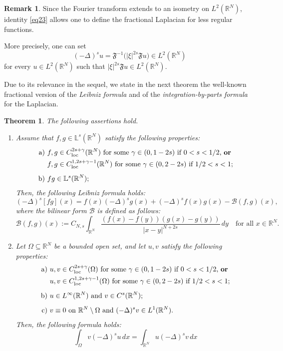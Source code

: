 \documentclass[11pt,a4paper,reqno]{amsart}
\def \R {\mathbb{R}}
\theoremstyle{definition}
\newtheorem{remark}[definition]{Remark}
\theoremstyle{plain}
\newtheorem{theorem}[definition]{Theorem}
\numberwithin{equation}{section}
\begin{document}
\begin{remark} \label{rem:hintweakLap}
Since the Fourier transform extends to an isometry on $L^2(\R^N)$, identity \eqref{eq23} allows one to define the fractional Laplacian for less regular functions.

More precisely, one can set
$$(-\Delta)^s u = \mathfrak F^{-1} \big( |\xi|^{2s}\mathfrak F u  \big)\in L^2(\R^N)$$
for every $u\in L^2(\R^N)$ such that $|\xi|^{2s}\mathfrak F u \in L^2(\R^N)$.
\end{remark}
Due to its relevance in the sequel,
we  state
in the next theorem the well-known frac\-tional version of the \emph{Leibniz formula} and of the \emph{integration-by-parts formula}
for the Laplacian.
\begin{theorem}  \label{thm:LeibnizandByParts}
The following assertions hold.
\begin{enumerate}
	\item Assume that $f,g\in\mathbb{L}^s(\R^N)$ satisfy
  the following properties:
\begin{align*}
	\mathrm{a)}\,\,&\text{$f,g\in C_{\mathrm{loc}}^{2s+\gamma}(\R^N)$ for some $\gamma\in (0,1-2s)$ if $0<s<1/2$, \textbf{or}} \\
	&\text{$f,g\in C^{1,2s+\gamma-1}_{\mathrm{loc}}(\R^N)$
	for some
  	$\gamma\in (0,2-2s)$ if $1/2<s<1$}; \\[0.15cm]
  	\mathrm{b)}\,\,&fg\in\mathbb{L}^s(\R^N);
\end{align*}
 Then, the following \emph{Leibniz formula} holds:
 \begin{equation}\label{eq:Leibniz_rule}
	(-\Delta)^s[fg](x) = f(x) (-\Delta)^s g(x) + (-\Delta)^sf(x) g(x) - \mathcal{B}(f,g)(x),
\end{equation}
\noindent where the bilinear form $\mathcal{B}$ is defined as follows:
\begin{equation}\label{eq:def_B}
	\mathcal{B}(f,g)(x):=C_{N,s}\int_{\mathbb{R}^{N}}\dfrac{(f(x)-f(y))(g(x)-g(y))}{|x-y|^{N+2s}}\, dy \quad \textrm{for all } x \in \mathbb{R}^{N}.
\end{equation}

\item Let $\Omega\subseteq\R^N$ be a bounded open set,
and let $u,v$ satisfy the following properties:
	\begin{align*}
	\mathrm{a)}\,\,&\text{$u,v\in C_{\mathrm{loc}}^{2s+\gamma}(\Omega)$ for some $\gamma\in (0,1-2s)$ if $0<s<1/2$, \textbf{or}} \\
	&\text{$u,v\in C^{1,2s+\gamma-1}_{\mathrm{loc}}
	(\Omega)$ for some
  	$\gamma\in (0,2-2s)$ if $1/2<s<1$}; \\[0.15cm]
  	\mathrm{b)}\,\,&\text{$u\in L^\infty(\R^N)$
  	and $v\in C^s(\R^N)$}; \\[0.15cm]
  	\mathrm{c)}\,\,&\text{$v\equiv 0$ on $\R^N\setminus\Omega$ and $(-\Delta)^sv\in L^1(\R^N)$}.
\end{align*}
Then, the following formula holds:
\begin{equation}\label{eq:Integration_by_parts}
	\int_\Omega v(-\Delta)^s u\,dx = \int_{\mathbb{R}^{N}}u (-\Delta)^s v \, dx
	\end{equation}
\end{enumerate}
\end{theorem}
\end{document}
